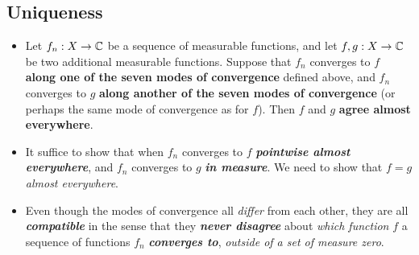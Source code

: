 \documentclass[11pt]{article}
\begin{document}
\subsection{Uniqueness}
\begin{itemize}
\item \begin{proposition}
Let $f_n : X \rightarrow {\mathbb C}$ be a sequence of measurable functions, and let $f, g : X \rightarrow {\mathbb C}$ be two additional measurable functions. Suppose that $f_n$ converges to $f$ \textbf{along one of the seven modes of convergence} defined above, and $f_n$ converges to $g$ \textbf{along another of the seven modes of convergence} (or perhaps the same mode of convergence as for $f$). Then $f$ and $g$ \textbf{agree almost everywhere}.
\end{proposition}

\item \begin{remark} It suffice to show that when $f_n$ converges to $f$ \emph{\textbf{pointwise almost everywhere}}, and $f_n$ converges to $g$ \emph{\textbf{in measure}}. We need to show that $f = g$ \emph{almost everywhere}. 
\end{remark}

\item \begin{remark}
Even though the modes of convergence all \emph{differ} from each other, they are all \emph{\textbf{compatible}} in the sense that they \emph{\textbf{never disagree}} about \emph{which function} $f$ a sequence of functions $f_n$ \emph{\textbf{converges to}}, \emph{outside of a set of measure zero}. 
\end{remark}
\end{itemize}
\end{document}

